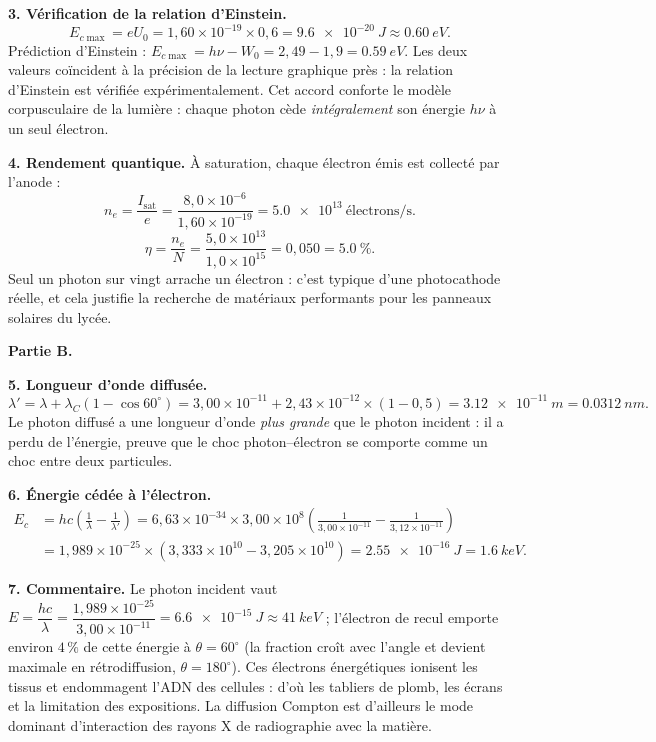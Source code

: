 \documentclass[11pt]{article}
\begin{document}
\begin{exoresolu}
\textbf{3. Vérification de la relation d'Einstein.}
\[ E_{c\max} = eU_0 = 1,60\times 10^{-19}\times 0,6 = \SI{9,6e-20}{J} \approx \SI{0,60}{eV}. \]
Prédiction d'Einstein : $E_{c\max} = h\nu - W_0 = 2,49 - 1,9 = \SI{0,59}{eV}$. Les deux valeurs coïncident à la précision de la lecture graphique près : la relation d'Einstein est vérifiée expérimentalement. Cet accord conforte le modèle corpusculaire de la lumière : chaque photon cède \emph{intégralement} son énergie $h\nu$ à un seul électron.

\textbf{4. Rendement quantique.} À saturation, chaque électron émis est collecté par l'anode :
\[ n_e = \frac{I_{\text{sat}}}{e} = \frac{8,0\times 10^{-6}}{1,60\times 10^{-19}} = \SI{5,0e13}{\text{électrons/s}}. \]
\[ \eta = \frac{n_e}{N} = \frac{5,0\times 10^{13}}{1,0\times 10^{15}} = 0,050 = \SI{5,0}{\%}. \]
Seul un photon sur vingt arrache un électron : c'est typique d'une photocathode réelle, et cela justifie la recherche de matériaux performants pour les panneaux solaires du lycée.

\textbf{Partie B.}

\textbf{5. Longueur d'onde diffusée.}
\[ \lambda' = \lambda + \lambda_C (1 - \cos 60^{\circ}) = 3,00\times 10^{-11} + 2,43\times 10^{-12}\times (1 - 0,5) = \SI{3,12e-11}{m} = \SI{0,0312}{nm}. \]
Le photon diffusé a une longueur d'onde \emph{plus grande} que le photon incident : il a perdu de l'énergie, preuve que le choc photon--électron se comporte comme un choc entre deux particules.

\textbf{6. Énergie cédée à l'électron.}
\begin{align*}
E_c &= hc\left(\frac{1}{\lambda} - \frac{1}{\lambda'}\right) = 6,63\times 10^{-34}\times 3,00\times 10^{8}\left(\frac{1}{3,00\times 10^{-11}} - \frac{1}{3,12\times 10^{-11}}\right)\\
&= 1,989\times 10^{-25}\times\left(3,333\times 10^{10} - 3,205\times 10^{10}\right) = \SI{2,55e-16}{J} = \SI{1,6}{keV}.
\end{align*}

\textbf{7. Commentaire.} Le photon incident vaut $E = \dfrac{hc}{\lambda} = \dfrac{1,989\times 10^{-25}}{3,00\times 10^{-11}} = \SI{6,6e-15}{J} \approx \SI{41}{keV}$ ; l'électron de recul emporte environ $4\,\%$ de cette énergie à $\theta = 60^{\circ}$ (la fraction croît avec l'angle et devient maximale en rétrodiffusion, $\theta = 180^{\circ}$). Ces électrons énergétiques ionisent les tissus et endommagent l'ADN des cellules : d'où les tabliers de plomb, les écrans et la limitation des expositions. La diffusion Compton est d'ailleurs le mode dominant d'interaction des rayons X de radiographie avec la matière.
\end{exoresolu}
\end{document}
